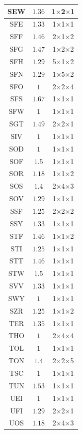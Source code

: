 \documentclass[main.tex]{subfiles}
\begin{document}
\begin{table}
{\begin{minipage}[t]{0.24\linewidth}
\begin{tabular}{|@{\hspace{2pt}}c@{\hspace{2pt}}|@{\hspace{2pt}}c@{\hspace{2pt}}|@{\hspace{2pt}}c@{\hspace{2pt}}|}
SEW&$1.36$&1$\times$2$\times$1\\\hline
SFE&$1.33$&1$\times$1$\times$1\\\hline
SFF&$1.46$&2$\times$1$\times$2\\\hline
SFG&$1.47$&1$\times$2$\times$2\\\hline
SFH&$1.29$&5$\times$1$\times$2\\\hline
SFN&$1.29$&1$\times$5$\times$2\\\hline
SFO&$1$&2$\times$2$\times$4\\\hline
SFS&$1.67$&1$\times$1$\times$1\\\hline
SFW&$1$&1$\times$1$\times$1\\\hline
SGT&$1.49$&2$\times$2$\times$1\\\hline
SIV&$1$&1$\times$1$\times$1\\\hline
SOD&$1$&1$\times$1$\times$1\\\hline
SOF&$1.5$&1$\times$1$\times$1\\\hline
SOR&$1.18$&1$\times$1$\times$2\\\hline
SOS&$1.4$&2$\times$4$\times$3\\\hline
SOV&$1.29$&1$\times$1$\times$1\\\hline
SSF&$1.25$&2$\times$2$\times$2\\\hline
SSY&$1.33$&1$\times$1$\times$1\\\hline
STF&$1.46$&1$\times$1$\times$2\\\hline
STI&$1.25$&1$\times$1$\times$1\\\hline
STT&$1.46$&1$\times$1$\times$1\\\hline
STW&$1.5$&1$\times$1$\times$1\\\hline
SVV&$1.33$&1$\times$1$\times$1\\\hline
SWY&$1$&1$\times$1$\times$1\\\hline
SZR&$1.25$&1$\times$1$\times$2\\\hline
TER&$1.35$&1$\times$1$\times$1\\\hline
THO&$1$&2$\times$4$\times$4\\\hline
TOL&$1$&1$\times$1$\times$1\\\hline
TON&$1.4$&2$\times$2$\times$5\\\hline
TSC&$1$&1$\times$1$\times$1\\\hline
TUN&$1.53$&1$\times$1$\times$1\\\hline
UEI&$1$&1$\times$1$\times$1\\\hline
UFI&$1.29$&2$\times$2$\times$1\\\hline
UOS&$1.18$&2$\times$4$\times$3\\\hline

\end{tabular}
\end{minipage}}
\end{table}
\end{document}
